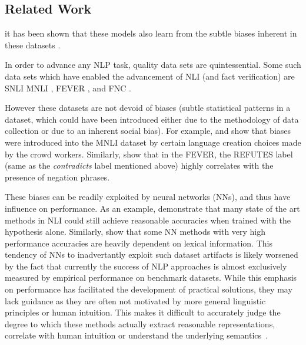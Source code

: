 \documentclass[compsoc,onecolumn]{IEEEtran}
\begin{document}
\subsection{Related Work}

it has been shown that these models also learn from the subtle biases inherent in these datasets \citep*{gururangan2018annotation}.



In order to advance any NLP task, quality data sets are quintessential. Some such data sets which have enabled the advancement of NLI (and fact verification) are SNLI \citep*{bowman2015large} MNLI \citep*{williams2017broad}, FEVER \citep*{thorne2018fever}, and FNC \citep*{pomerleau2017fake}.

However these datasets are not devoid of biases (subtle statistical patterns in a dataset, which could have been introduced either due to the methodology of data collection or due to an inherent social bias). 
For example, \citep*{gururangan2018annotation} and \citep*{poliak2018hypothesis} show that biases were introduced into the MNLI dataset by certain language creation choices made by the crowd workers. Similarly, \citep*{schuster2019towards} show that in the FEVER, the REFUTES label (same as the \textit{contradicts} label mentioned above) highly correlates with the presence of negation phrases. 

These biases can be readily exploited by neural networks (NNs), and thus have influence on performance.  As an example, \citep*{gururangan2018annotation} demonstrate that many state of the art methods in NLI could still achieve reasonable accuracies when trained with the hypothesis alone. Similarly, \citep*{emnlp2019sandeep} show that some NN methods with very high performance accuracies are heavily dependent on lexical information. This tendency of NNs to inadvertantly exploit such dataset artifacts is likely worsened by the fact that currently the success of NLP approaches is almost exclusively measured by empirical performance on benchmark datasets. While this emphasis on performance has facilitated the development of practical solutions, they may lack guidance as they are often not motivated by more general linguistic principles or human intuition. This makes it difficult to accurately judge the degree to which these methods actually extract reasonable representations, correlate with  human intuition or understand the underlying semantics~\citep*{dagan2013recognizing}.
\end{document}
